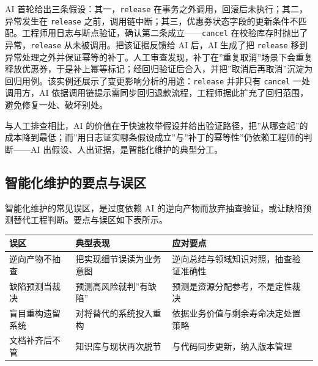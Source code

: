 \documentclass[
]{ctexbook}
\newcounter{none}
\begin{document}
AI 首轮给出三条假设：其一，\texttt{release}
在事务之外调用，回滚后未执行；其二，异常发生在 \texttt{release}
之前，调用链中断；其三，优惠券状态字段的更新条件不匹配。工程师用日志与断点验证，确认第二条成立------\texttt{cancel}
在校验库存时抛出了异常，\texttt{release} 从未被调用。把该证据反馈给 AI
后，AI 生成了把 \texttt{release}
移到异常处理之外并保证幂等的补丁。人工审查发现，补丁在''重复取消''场景下会重复释放优惠券，于是补上幂等标记；经回归验证后合入，并把''取消后再取消''沉淀为回归用例。该实例还展示了变更影响分析的用途：\texttt{release}
并非只有 \texttt{cancel} 一处调用方，AI
依据调用链提示需同步回归退款流程，工程师据此扩充了回归范围，避免修复一处、破坏别处。

与人工排查相比，AI
的价值在于快速枚举假设并给出验证路径，把''从哪查起''的成本降到最低；而''用日志证实哪条假设成立''与''补丁的幂等性''仍依赖工程师的判断------AI
出假设、人出证据，是智能化维护的典型分工。

\subsection{智能化维护的要点与误区}\label{ux667aux80fdux5316ux7ef4ux62a4ux7684ux8981ux70b9ux4e0eux8befux533a}

智能化维护的常见误区，是过度依赖 AI
的逆向产物而放弃抽查验证，或让缺陷预测替代工程判断。要点与误区如下表所示。

{\def\LTcaptype{none} %
\begin{longtable}[]{@{}
  >{\raggedright\arraybackslash}p{}
  >{\raggedright\arraybackslash}p{}
  >{\raggedright\arraybackslash}p{}@{}}
\toprule\noalign{}
\begin{minipage}[b]{\linewidth}\raggedright
误区
\end{minipage} & \begin{minipage}[b]{\linewidth}\raggedright
典型表现
\end{minipage} & \begin{minipage}[b]{\linewidth}\raggedright
应对要点
\end{minipage} \\
\midrule\noalign{}
\endhead
\bottomrule\noalign{}
\endlastfoot
逆向产物不抽查 & 把实现细节误读为业务意图 &
逆向总结与领域知识对照，抽查验证准确性 \\
缺陷预测当裁决 & 预测高风险就判''有缺陷'' &
预测是资源分配参考，不是定性裁决 \\
盲目重构遗留系统 & 对将替代的系统投入重构 &
依据业务价值与剩余寿命决定处置策略 \\
文档补齐后不管 & 知识库与现状再次脱节 & 与代码同步更新，纳入版本管理 \\
\end{longtable}
}
\end{document}
